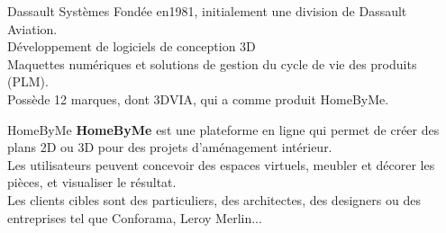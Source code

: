 \documentclass{ENSEIRB_poster}
\begin{document}
\begin{frame}[t]
\begin{columns}[c]
    \begin{column}{\sepwidth}\end{column} %
  \end{columns}




  \begin{columns}[t]
    \begin{column}{\sepwidth}\end{column} %

    \begin{column}{\twocolwidth}
      \begin{block}{Dassault Systèmes}
        Fondée en1981, initialement une division de Dassault Aviation.\\
        Développement de logiciels de conception 3D \\
        Maquettes numériques et solutions de gestion du cycle de vie des produits (PLM).\\ 
        Possède 12 marques, dont 3DVIA, qui a comme produit HomeByMe.
      \end{block}

      \vspace{5pt}

      \begin{alertblock}{HomeByMe}
        \textbf{HomeByMe} est une plateforme en ligne qui permet de créer des plans 2D ou 3D pour des projets d'aménagement intérieur. \\
        Les utilisateurs peuvent concevoir des espaces virtuels, meubler et décorer les pièces, et visualiser le résultat.\\
        Les clients cibles sont des particuliers, des architectes, des designers ou des entreprises tel que Conforama, Leroy Merlin...
      \end{alertblock}


\end{column}
\end{columns}
\end{frame}
\end{document}
